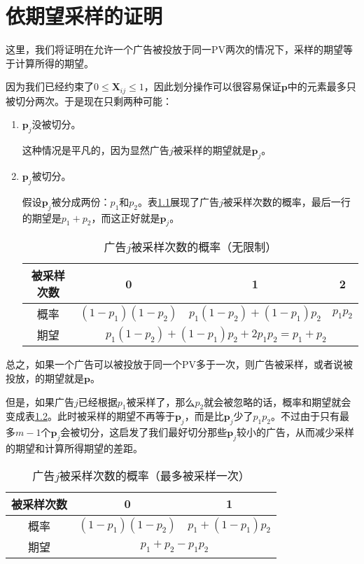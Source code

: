 \chapter{依期望采样的证明}
\label{cha:proof}

这里，我们将证明在允许一个广告被投放于同一PV两次的情况下，采样的期望等于计算所得的期望。

因为我们已经约束了$0 \le \bm{X}_{ij} \le 1$，因此划分操作可以很容易保证$\bm{p}$中的元素最多只被切分两次。于是现在只剩两种可能：
\begin{enumerate}[1)]
	\item $\bm{p}_j$没被切分。
	
	这种情况是平凡的，因为显然广告$j$被采样的期望就是$\bm{p}_j$。
	
	\item $\bm{p}_j$被切分。
	
	假设$\bm{p}_j$被分成两份：$p_1$和$p_2$。表\ref{tab:prob}展现了广告$j$被采样次数的概率，最后一行的期望是$p_1+p_2$，而这正好就是$\bm{p}_j$。
	\begin{table}[htb]
		\centering
		\caption{广告$j$被采样次数的概率（无限制）}
		\label{tab:prob}
		\begin{tabular}{cccc}
			\toprule
			被采样次数&0&1&2\\
			\midrule
			概率 & $ (1-p_1) (1-p_2)$ & $p_1 (1-p_2) +  (1-p_1)p_2$ & $p_1p_2$ \\
			\midrule
			期望 & \multicolumn{3}{c}{$p_1 (1-p_2) +  (1-p_1)p_2 + 2p_1p_2 = p_1 + p_2$} \\
			\bottomrule
		\end{tabular}
	\end{table}

\end{enumerate}

总之，如果一个广告可以被投放于同一个PV多于一次，则广告被采样，或者说被投放，的期望就是$\bm{p}$。

但是，如果广告$j$已经根据$p_1$被采样了，那么$p_2$就会被忽略的话，概率和期望就会变成表\ref{tab:prob_less}。此时被采样的期望不再等于$\bm{p}_j$，而是比$\bm{p}_j$少了$p_1p_2$。不过由于只有最多$m-1$个$\bm{p}_j$会被切分，这启发了我们最好切分那些$\bm{p}_j$较小的广告，从而减少采样的期望和计算所得期望的差距。

\begin{table}[htb]
	\centering
	\caption{广告$j$被采样次数的概率（最多被采样一次）}
	\label{tab:prob_less}
	\begin{tabular}{ccc}
		\toprule
		被采样次数&0&1\\
		\midrule
		概率 & $ (1-p_1) (1-p_2)$ & $p_1 +  (1-p_1)p_2$ \\
		\midrule
		期望 & \multicolumn{2}{c}{$p_1 + p_2 - p_1p_2$} \\
		\bottomrule
	\end{tabular}
\end{table}


